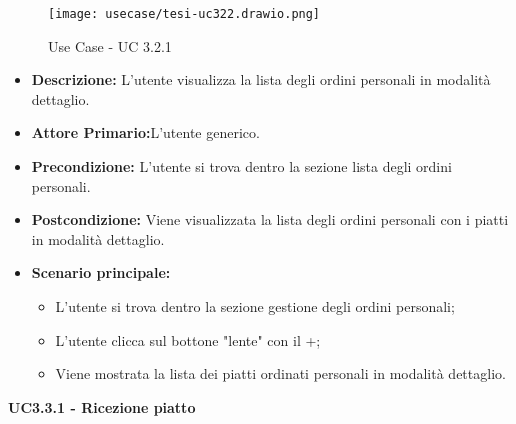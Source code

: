 \begin{figure}[H]
    \centering
    \texttt{[image: usecase/tesi-uc322.drawio.png]}
    \caption{Use Case - UC 3.2.1}
\end{figure}
\begin{itemize}
    \item \textbf{Descrizione:} L'utente visualizza la lista degli ordini personali in modalità dettaglio.
    \item \textbf{Attore Primario:}L'utente generico.
    \item \textbf{Precondizione:} L'utente si trova dentro la sezione lista degli ordini personali.
    \item \textbf{Postcondizione:} Viene visualizzata la lista degli ordini personali con i piatti in modalità dettaglio.
    \item \textbf{Scenario principale:}
    \begin{itemize}
        \item L'utente si trova dentro la sezione gestione degli ordini personali;
        \item L'utente clicca sul bottone "lente" con il +;
        \item Viene mostrata la lista dei piatti ordinati personali in modalità dettaglio.
    \end{itemize}
\end{itemize}
\textbf{UC3.3.1 - Ricezione piatto}
